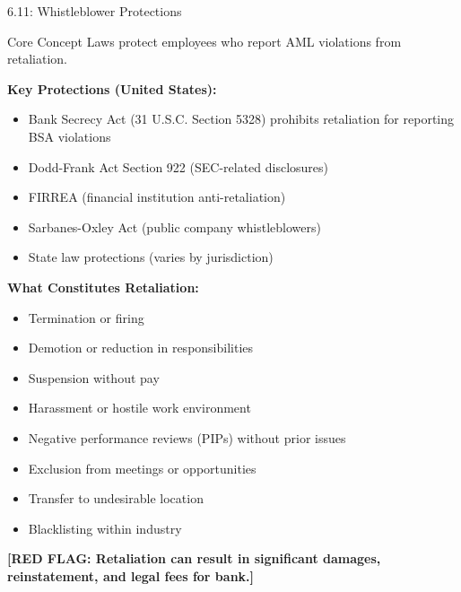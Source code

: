 \documentclass[11pt,a4paper]{beamer}
\newcommand{\redflag}[1]{\textcolor{red!80!black}{\textbf{[RED FLAG: #1]}}}
\begin{document}

\begin{frame}{6.11: Whistleblower Protections}
	\begin{block}{Core Concept}
		Laws protect employees who report AML violations from retaliation.
	\end{block}
	\textbf{Key Protections (United States):}
	\begin{itemize}
		\item Bank Secrecy Act (31 U.S.C. Section 5328) prohibits retaliation for reporting BSA violations
		\item Dodd-Frank Act Section 922 (SEC-related disclosures)
		\item FIRREA (financial institution anti-retaliation)
		\item Sarbanes-Oxley Act (public company whistleblowers)
		\item State law protections (varies by jurisdiction)
	\end{itemize}
	\textbf{What Constitutes Retaliation:}
	\begin{itemize}
		\item Termination or firing
		\item Demotion or reduction in responsibilities
		\item Suspension without pay
		\item Harassment or hostile work environment
		\item Negative performance reviews (PIPs) without prior issues
		\item Exclusion from meetings or opportunities
		\item Transfer to undesirable location
		\item Blacklisting within industry
	\end{itemize}
	\redflag{Retaliation can result in significant damages, reinstatement, and legal fees for bank.}
\end{frame}
\end{document}
